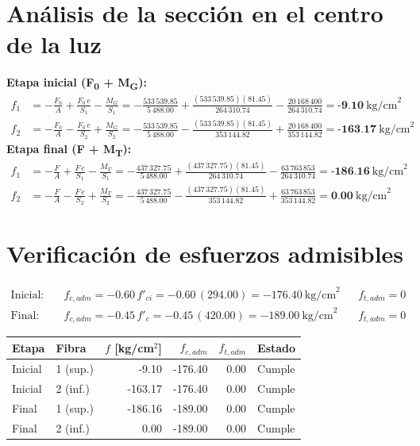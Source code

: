\documentclass[11pt,a4paper]{article}
\begin{document}
\section{Análisis de la sección en el centro de la luz}
\textbf{Etapa inicial (F\textsubscript{0} + M\textsubscript{G}):}
\begin{align*}
f_1 &= -\frac{F_0}{A} + \frac{F_0\,e}{S_1} - \frac{M_G}{S_1}
= -\frac{533\,539.85}{5\,488.00} + \frac{(533\,539.85)(81.45)}{264\,310.74} - \frac{20\,168\,400}{264\,310.74} = \textbf{-9.10}\ \text{kg/cm}^2\\
f_2 &= -\frac{F_0}{A} - \frac{F_0\,e}{S_2} + \frac{M_G}{S_2}
= -\frac{533\,539.85}{5\,488.00} - \frac{(533\,539.85)(81.45)}{353\,144.82} + \frac{20\,168\,400}{353\,144.82} = \textbf{-163.17}\ \text{kg/cm}^2
\end{align*}
\textbf{Etapa final (F + M\textsubscript{T}):}
\begin{align*}
f_1 &= -\frac{F}{A} + \frac{F\,e}{S_1} - \frac{M_T}{S_1}
= -\frac{437\,327.75}{5\,488.00} + \frac{(437\,327.75)(81.45)}{264\,310.74} - \frac{63\,763\,853}{264\,310.74} = \textbf{-186.16}\ \text{kg/cm}^2\\
f_2 &= -\frac{F}{A} - \frac{F\,e}{S_2} + \frac{M_T}{S_2}
= -\frac{437\,327.75}{5\,488.00} - \frac{(437\,327.75)(81.45)}{353\,144.82} + \frac{63\,763\,853}{353\,144.82} = \textbf{0.00}\ \text{kg/cm}^2
\end{align*}


\section{Verificación de esfuerzos admisibles}
\begin{align*}
\text{Inicial:}\quad & f_{c,adm} = -0.60\,f'_{ci} = -0.60\,(294.00) = -176.40\ \text{kg/cm}^2 & & f_{t,adm} = 0\\
\text{Final:}\quad & f_{c,adm} = -0.45\,f'_c = -0.45\,(420.00) = -189.00\ \text{kg/cm}^2 & & f_{t,adm} = 0
\end{align*}

\begin{center}
\begin{tabular}{llrrrl}
\toprule
Etapa & Fibra & $f$ [kg/cm$^2$] & $f_{c,adm}$ & $f_{t,adm}$ & Estado \\
\midrule
Inicial & 1 (sup.) & -9.10 & -176.40 & 0.00 & \textcolor{verde}{Cumple} \\
Inicial & 2 (inf.) & -163.17 & -176.40 & 0.00 & \textcolor{verde}{Cumple} \\
Final & 1 (sup.) & -186.16 & -189.00 & 0.00 & \textcolor{verde}{Cumple} \\
Final & 2 (inf.) & 0.00 & -189.00 & 0.00 & \textcolor{verde}{Cumple} \\
\bottomrule
\end{tabular}
\end{center}
\end{document}
